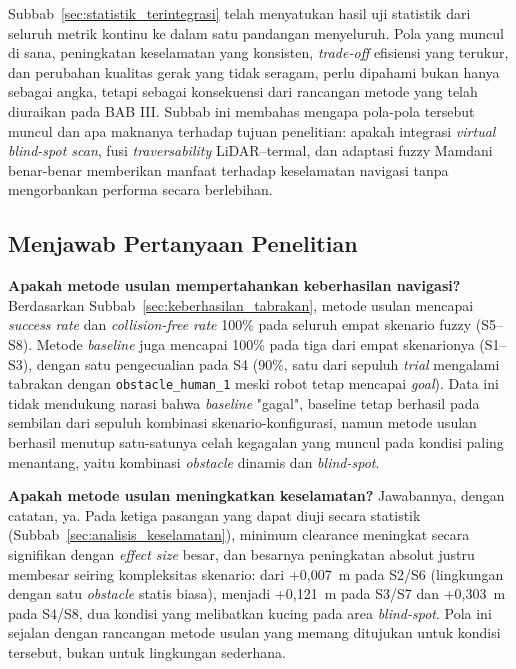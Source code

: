 Subbab~\ref{sec:statistik_terintegrasi} telah menyatukan hasil uji statistik
dari seluruh metrik kontinu ke dalam satu pandangan menyeluruh. Pola yang
muncul di sana, peningkatan keselamatan yang konsisten, \textit{trade-off}
efisiensi yang terukur, dan perubahan kualitas gerak yang tidak seragam,
perlu dipahami bukan hanya sebagai angka, tetapi sebagai konsekuensi dari
rancangan metode yang telah diuraikan pada BAB III. Subbab ini membahas
mengapa pola-pola tersebut muncul dan apa maknanya terhadap tujuan
penelitian: apakah integrasi \textit{virtual blind-spot scan}, fusi
\textit{traversability} LiDAR--termal, dan adaptasi fuzzy Mamdani benar-benar
memberikan manfaat terhadap keselamatan navigasi tanpa mengorbankan performa
secara berlebihan.

\subsection{Menjawab Pertanyaan Penelitian}

\textbf{Apakah metode usulan mempertahankan keberhasilan navigasi?}
Berdasarkan Subbab~\ref{sec:keberhasilan_tabrakan}, metode usulan mencapai
\textit{success rate} dan \textit{collision-free rate} 100\% pada seluruh
empat skenario fuzzy (S5--S8). Metode \textit{baseline} juga mencapai 100\%
pada tiga dari empat skenarionya (S1--S3), dengan satu pengecualian pada S4
(90\%, satu dari sepuluh \textit{trial} mengalami tabrakan dengan
\texttt{obstacle\_human\_1} meski robot tetap mencapai \textit{goal}). Data
ini tidak mendukung narasi bahwa \textit{baseline} "gagal", baseline tetap
berhasil pada sembilan dari sepuluh kombinasi skenario-konfigurasi, namun
metode usulan berhasil menutup satu-satunya celah kegagalan yang muncul pada
kondisi paling menantang, yaitu kombinasi \textit{obstacle} dinamis dan
\textit{blind-spot}.

\textbf{Apakah metode usulan meningkatkan keselamatan?} Jawabannya, dengan
catatan, ya. Pada ketiga pasangan yang dapat diuji secara statistik
(Subbab~\ref{sec:analisis_keselamatan}), minimum clearance meningkat secara
signifikan dengan \textit{effect size} besar, dan besarnya peningkatan
absolut justru membesar seiring kompleksitas skenario: dari +0,007~m pada
S2/S6 (lingkungan dengan satu \textit{obstacle} statis biasa), menjadi
+0,121~m pada S3/S7 dan +0,303~m pada S4/S8, dua kondisi yang melibatkan
kucing pada area \textit{blind-spot}. Pola ini sejalan dengan rancangan
metode usulan yang memang ditujukan untuk kondisi tersebut, bukan untuk
lingkungan sederhana.

